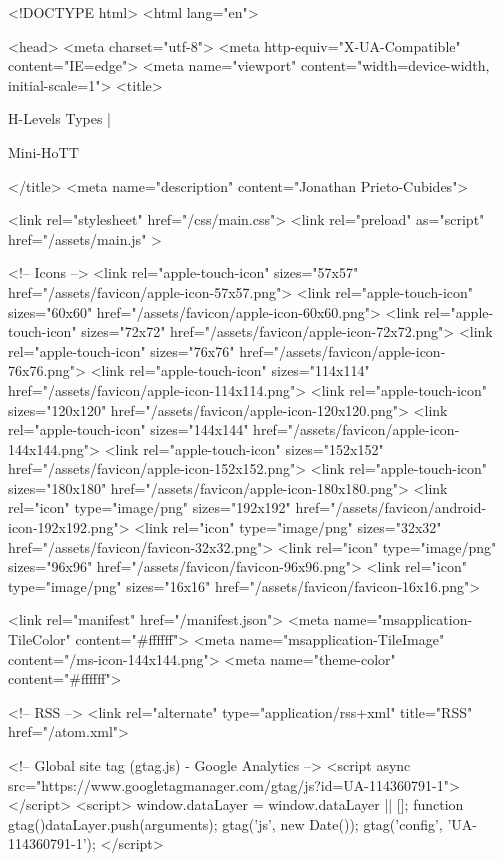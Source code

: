 <!DOCTYPE html>
<html lang="en">

<head>
  <meta charset="utf-8">
  <meta http-equiv="X-UA-Compatible" content="IE=edge">
  <meta name="viewport" content="width=device-width, initial-scale=1">
  <title>
    
      
        H-Levels Types |
      
        Mini-HoTT
    
  </title>
  <meta name="description" content="Jonathan Prieto-Cubides">

  <link rel="stylesheet" href="/css/main.css">
  <link rel="preload" as="script" href="/assets/main.js" >

  <!-- Icons -->
  <link rel="apple-touch-icon" sizes="57x57" href="/assets/favicon/apple-icon-57x57.png">
  <link rel="apple-touch-icon" sizes="60x60" href="/assets/favicon/apple-icon-60x60.png">
  <link rel="apple-touch-icon" sizes="72x72" href="/assets/favicon/apple-icon-72x72.png">
  <link rel="apple-touch-icon" sizes="76x76" href="/assets/favicon/apple-icon-76x76.png">
  <link rel="apple-touch-icon" sizes="114x114" href="/assets/favicon/apple-icon-114x114.png">
  <link rel="apple-touch-icon" sizes="120x120" href="/assets/favicon/apple-icon-120x120.png">
  <link rel="apple-touch-icon" sizes="144x144" href="/assets/favicon/apple-icon-144x144.png">
  <link rel="apple-touch-icon" sizes="152x152" href="/assets/favicon/apple-icon-152x152.png">
  <link rel="apple-touch-icon" sizes="180x180" href="/assets/favicon/apple-icon-180x180.png">
  <link rel="icon" type="image/png" sizes="192x192"  href="/assets/favicon/android-icon-192x192.png">
  <link rel="icon" type="image/png" sizes="32x32" href="/assets/favicon/favicon-32x32.png">
  <link rel="icon" type="image/png" sizes="96x96" href="/assets/favicon/favicon-96x96.png">
  <link rel="icon" type="image/png" sizes="16x16" href="/assets/favicon/favicon-16x16.png">

  <link rel="manifest" href="/manifest.json">
  <meta name="msapplication-TileColor" content="#ffffff">
  <meta name="msapplication-TileImage" content="/ms-icon-144x144.png">
  <meta name="theme-color" content="#ffffff">

  <!-- RSS -->
  <link rel="alternate" type="application/rss+xml" title="RSS" href="/atom.xml">

  <!-- Global site tag (gtag.js) - Google Analytics -->
  <script async src="https://www.googletagmanager.com/gtag/js?id=UA-114360791-1"></script>
  <script>
    window.dataLayer = window.dataLayer || [];
    function gtag(){dataLayer.push(arguments);}
    gtag('js', new Date());
    gtag('config', 'UA-114360791-1');
  </script>

